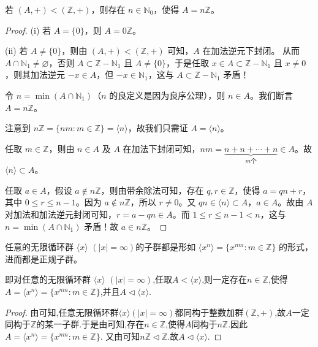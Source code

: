 \documentclass[../../main.tex]{subfiles}
\begin{document}
\begin{proposition}\label{proposition:Z的任意子群都形如nZ}
若 $(A, +)<(\mathbb{Z}, +)$，则存在 $n\in\mathbb{N}_0$，使得 $A = n\mathbb{Z}$。
\end{proposition}
\begin{proof}
(i) 若 $A = \{0\}$，则 $A = 0\mathbb{Z}$。

(ii) 若 $A\neq\{0\}$，则由 $(A, +)<(\mathbb{Z}, +)$ 可知，$A$ 在加法逆元下封闭。
从而 $A\cap\mathbb{N}_1\neq\varnothing$，否则 $A\subset\mathbb{Z}-\mathbb{N}_1$ 且 $A\neq\{0\}$，于是任取 $x\in A\subset\mathbb{Z}-\mathbb{N}_1$ 且 $x\neq 0$，则其加法逆元 $-x\in A$，但 $-x\in\mathbb{N}_1$，这与 $A\subset\mathbb{Z}-\mathbb{N}_1$ 矛盾！

令 $n = \min(A\cap\mathbb{N}_1)$（$n$ 的良定义是因为良序公理），则 $n\in A$。我们断言 $A = n\mathbb{Z}$。

注意到 $n\mathbb{Z}=\{nm:m\in\mathbb{Z}\}=\langle n\rangle$，故我们只需证 $A = \langle n\rangle$。

任取 $m\in\mathbb{Z}$，则由 $n\in A$ 及 $A$ 在加法下封闭可知，$nm=\underset{m\text{个}}{\underbrace{n + n+\cdots + n}}\in A$。故 $\langle n\rangle\subset A$。

任取 $a\in A$，假设 $a\notin n\mathbb{Z}$，则由带余除法可知，存在 $q,r\in\mathbb{Z}$，使得 $a = qn + r$，其中 $0\leqslant r\leqslant n - 1$。因为 $a\notin n\mathbb{Z}$，所以 $r\neq 0$。又 $qn\in\langle n\rangle\subset A$，$a\in A$。故由 $A$ 对加法和加法逆元封闭可知，$r = a - qn\in A$。而 $1\leqslant r\leqslant n - 1 < n$，这与 $n = \min(A\cap\mathbb{N}_1)$ 矛盾！故 $a\in n\mathbb{Z}$。 

\end{proof}

\begin{corollary}
任意的无限循环群 $\langle x\rangle$ $(|x|=\infty)$的子群都是形如 $\langle x^n\rangle=\{x^{nm}:m\in\mathbb{Z}\}$ 的形式，进而都是正规子群。
 
即对任意的无限循环群 $\langle x\rangle$ $(|x|=\infty)$,任取$A<\langle x\rangle$,则一定存在$n\in \mathbb{Z}$,使得$A=\langle x^n\rangle=\{x^{nm}:m\in\mathbb{Z}\}$,并且$A\lhd \langle x\rangle$.
\end{corollary}
\begin{proof}
由可知,任意无限循环群$\langle x\rangle(|x|=\infty)$都同构于整数加群$(\mathbb{Z},+)$,故$A$一定同构于$\mathbb{Z}$的某一子群.于是由可知,存在$n\in \mathbb{Z}$,使得$A$同构于$n \mathbb{Z}$.因此$A=\langle x^n\rangle=\{x^{nm}:m\in\mathbb{Z}\}$.
又由可知$n \mathbb{Z}\lhd \mathbb{Z}$.故$A\lhd \langle x\rangle$.

\end{proof}
\end{document}
